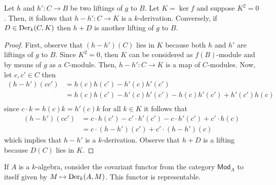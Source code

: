 \begin{lemma}\label{lemm:two-liftings}
	Let $h$ and $h'\colon C \to B$ be two liftings of $g$ to $B$. Let $K = \ker f$ and suppose $K^{2} = 0$. Then, it follows that $h - h'\colon C \to K$ is a $k$-derivation. Conversely, if $D \in \operatorname{Der}_{k}(C, K)$ then $h + D$ is another lifting of $g$ to $B$.
\end{lemma}
\begin{proof}
	First, observe that $(h - h')(C)$ lies in $K$ because both $h$ and $h'$ are liftings of $g$ to $B$. Since $K^{2} = 0$, then $K$ can be considered as $f(B)$-module and by means of $g$ as a $C$-module. Then, $h-h'\colon C \to K$ is a map of $C$-modules. Now, let $c,c' \in C$ then
	\begin{align*}
	(h -h')(cc') &= h(c)h(c') - h'(c)h'(c') \\
	&= h(c)h(c') - h'(c)h'(c') - h(c)h'(c') + h'(c')h(c) \\
	\end{align*}
	since $c \cdot k = h(c)k = h'(c)k$ for all $k \in K$ it follows that
	\begin{align*}
		(h -h')(cc') &= c\cdot h(c') - c'\cdot h'(c') - c\cdot h'(c') + c'\cdot h(c) \\
		&= c\cdot (h - h')(c') + c'\cdot (h - h')(c)
	\end{align*}
	which implies that $h - h'$ is a $k$-derivation. Observe that $h + D$ is a lifting because $D(C)$ lies in $K$.
\end{proof}
\begin{theorem}\label{prop:differentials-representable-functor}
	If $A$ is a $k$-algebra, consider the covariant functor from the category $\mathsf{Mod}_{A}$ to itself given by $M \mapsto \operatorname{Der}_{k}(A,M)$. This functor is representable. 
\end{theorem}
